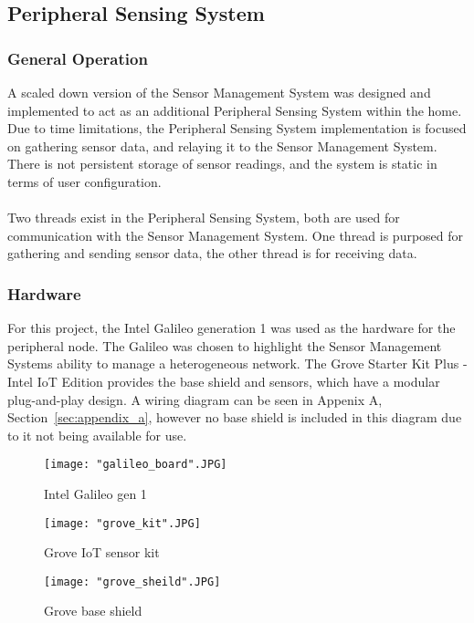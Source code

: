 \documentclass{article}
\begin{document}
\newpage
\subsection{Peripheral Sensing System}
\subsubsection{General Operation}
A scaled down version of the Sensor Management System was designed and implemented to act as an additional Peripheral Sensing System within the home. Due to time limitations, the Peripheral Sensing System implementation is focused on gathering sensor data, and relaying it to the Sensor Management System. There is not persistent storage of sensor readings, and the system is static in terms of user configuration. \\\\
Two threads exist in the Peripheral Sensing System, both are used for communication with the Sensor Management System. One thread is purposed for gathering and sending sensor data, the other thread is for receiving data. 

\subsubsection{Hardware}
For this project, the Intel Galileo generation 1 was used as the hardware for the peripheral node. The Galileo was chosen to highlight the Sensor Management Systems ability to manage a heterogeneous network. The Grove Starter Kit Plus - Intel IoT Edition provides the base shield and sensors, which have a modular plug-and-play design. A wiring diagram can be seen in Appenix A, Section~\ref{sec:appendix_a}, however no base shield is included in this diagram due to it not being available for use. 

\begin{figure}[H]
\centering
\texttt{[image: "galileo\_board".JPG]}
\caption{Intel Galileo gen 1}
\label{fig:hard_galileo}
\end{figure}

\begin{figure}[H]
\centering
\texttt{[image: "grove\_kit".JPG]}
\caption{Grove IoT sensor kit}
\label{fig:hard_grove_kit}
\end{figure}

\begin{figure}[H]
\centering
\texttt{[image: "grove\_sheild".JPG]}
\caption{Grove base shield}
\label{fig:hard_grove_sheild}
\end{figure}
\end{document}
